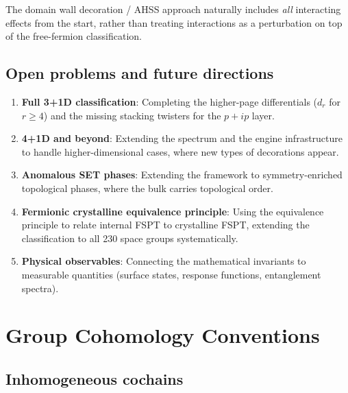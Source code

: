 \documentclass{SciPost}
\theoremstyle{definition}
\begin{document}
The domain wall decoration / AHSS approach naturally includes \emph{all} interacting effects from the start, rather than treating interactions as a perturbation on top of the free-fermion classification.

\subsection{Open problems and future directions}

\begin{enumerate}
    \item \textbf{Full 3+1D classification}: Completing the higher-page differentials ($d_r$ for $r \geq 4$) and the missing stacking twisters for the $p + ip$ layer.
    
    \item \textbf{4+1D and beyond}: Extending the spectrum and the engine infrastructure to handle higher-dimensional cases, where new types of decorations appear.
    
    \item \textbf{Anomalous SET phases}: Extending the framework to symmetry-enriched topological phases, where the bulk carries topological order.
    
    \item \textbf{Fermionic crystalline equivalence principle}: Using the equivalence principle to relate internal FSPT to crystalline FSPT, extending the classification to all 230 space groups systematically.
    
    \item \textbf{Physical observables}: Connecting the mathematical invariants to measurable quantities (surface states, response functions, entanglement spectra).
\end{enumerate}


\appendix

\section{Group Cohomology Conventions}
\label{ap:group-cohomology}

\subsection{Inhomogeneous cochains}
\end{document}
